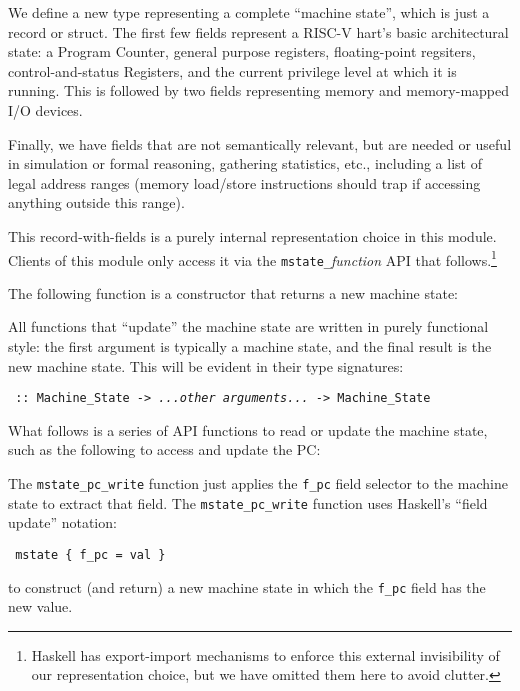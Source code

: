 \documentclass[11pt]{article}
\newcommand{\hmm}{\hspace*{2em}}
\begin{document}
We define a new type representing a complete ``machine state'', which
is just a record or struct.  The first few fields represent a RISC-V
hart's basic architectural state: a Program Counter, general purpose
registers, floating-point regsiters, control-and-status Registers, and
the current privilege level at which it is running. This is followed
by two fields representing memory and memory-mapped I/O devices.

Finally, we have fields that are not semantically relevant, but are
needed or useful in simulation or formal reasoning, gathering
statistics, etc., including a list of legal address ranges (memory
load/store instructions should trap if accessing anything outside this
range).



This record-with-fields is a purely internal representation choice in
this module.  Clients of this module only access it via the
\verb|mstate_|{\it{}function} API that follows.\footnote{Haskell has
export-import mechanisms to enforce this external invisibility of our
representation choice, but we have omitted them here to avoid
clutter.}

The following function is a constructor that returns a new machine state:



All functions that ``update'' the machine state are written in purely
functional style: the first argument is typically a machine state, and
the final result is the new machine state.  This will be evident in
their type signatures:

\begin{tabbing}\tt
\hmm {\it somefunction} :: Machine\_State -> {\it ...other arguments...} -> Machine\_State
\end{tabbing}

What follows is a series of API functions to read or update the
machine state, such as the following to access and update the PC:



The \verb|mstate_pc_write| function just applies the \verb|f_pc| field
selector to the machine state to extract that field.  The
\verb|mstate_pc_write| function uses Haskell's ``field update'' notation:

\begin{tabbing}\tt
\hmm \verb|mstate { f_pc = val }|
\end{tabbing}
to construct (and return) a new machine state in which the \verb|f_pc|
field has the new value.
\end{document}
